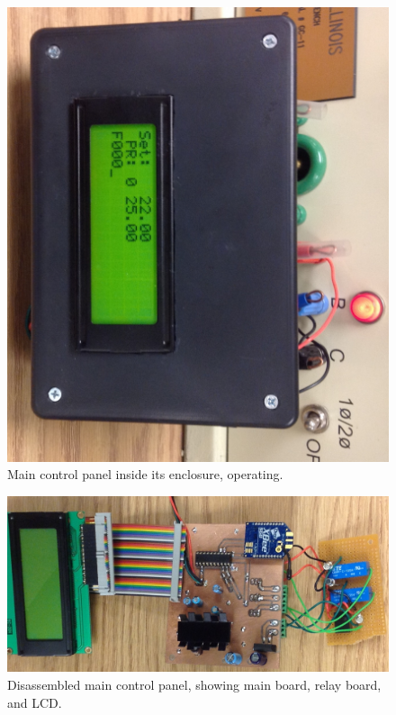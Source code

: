 \begin{figure}
\centering
\includegraphics[width=.99\textwidth]{main_panel_box.jpg}
\caption{Main control panel inside its enclosure, operating.}
\label{fig:main_panel_box}
\end{figure}

\begin{figure}
\centering
\includegraphics[height=.9\textheight]{main_panel_apart.jpg}
\caption{Disassembled main control panel, showing main board, relay board, and LCD.}
\label{fig:main_panel_apart}
\end{figure}

